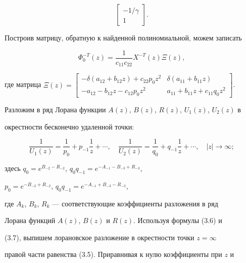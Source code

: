 \begin{pf}
\begin{equation}
\begin{bmatrix} -1/\gamma \\ 1 \end{bmatrix}. 


\end{equation} 


Построив матрицу, обратную к найденной полиномиальной, можем записать 


\begin{equation} 


\Phi^{-T}_0(z)=\frac{1}{c_{11}c_{22}}X^{-T}(z)\Xi(z), 


\end{equation} 


где матрица $\Xi(z)=\left[\begin{smallmatrix} 


-\delta(a_{12}+b_{12}z)+c_{22}p_0z^2 & 


\delta(a_{11}+b_{11}z) \\ 


-a_{12}-b_{12}z-c_{12}p_0z^2 & 


a_{11}+b_{11}z+c_{11}q_0z^2 


\end{smallmatrix}\right]$. 


 


Разложим в ряд Лорана функции $A(z)$, $B(z)$, $R(z)$, $U_1(z)$, $U_2(z)$ в 


окрестности бесконечно удаленной точки: 


$$ 


\frac{1}{U_1(z)}=\frac{1}{p_0}+p_{-1}\frac{1}{z}+\dotsb,\quad 


\frac{1}{U_2(z)}=\frac{1}{q_0}+q_{-1}\frac{1}{z}+\dotsb,\quad 


|z|\to\infty; 


$$ 


здесь $q_0=e^{B_{-2}-R_{-2}}$, $q_0q_{-1}=e^{-A_{-1}-B_{-3}+R_{-3}}$, 


$p_0=e^{-B_{-2}+R_{-2}}$, $q_0q_{-1}=e^{-A_{-1}+B_{-3}-R_{-3}}$, 


где $A_k$, $B_k$, $R_k$ --- соответствующие коэффициенты разложения в ряд 


Лорана функций $A(z)$, $B(z)$ и $R(z)$. Используя формулы (3.6) и 


(3.7), выпишем лорановское разложение в окрестности точки $z=\infty$ 


правой части равенства (3.5). Приравнивая к нулю коэффициенты при $z$ и 



\end{pf}
